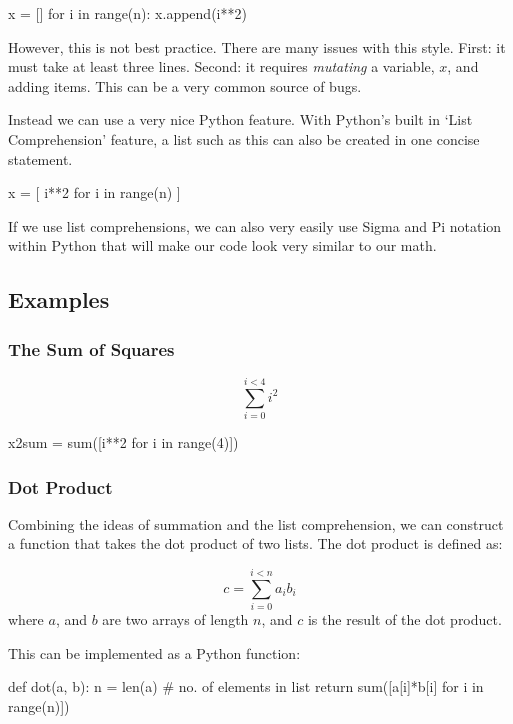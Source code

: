 \documentclass{../../KDHnotes}
\begin{document}
\begin{python}
x = []
for i in range(n):
    x.append(i**2)
\end{python}

However, this is not best practice. There are many issues with this style. First: it must take at least three lines. Second: it requires \textit{mutating} a variable, $x$, and adding items. This can be a very common source of bugs.

Instead we can use a very nice Python feature. With Python's built in `List Comprehension' feature, a list such as this can also be created in one concise statement.

\begin{python}
x = [ i**2 for i in range(n) ]
\end{python}


If we use list comprehensions, we can also very easily use Sigma and Pi notation within Python that will make our code look very similar to our math.

\subsection{Examples}

\subsubsection{The Sum of Squares}
\begin{equation}
\sum_{i=0}^{i<4} i^2
\end{equation}

\begin{python}
x2sum = sum([i**2 for i in range(4)])
\end{python}



\subsubsection{Dot Product}

Combining the ideas of summation and the list comprehension, we can construct a function that takes the dot product of two lists. The dot product is defined as:

\begin{equation}
	c = \sum_{i=0}^{i<n} a_i b_i
\end{equation}
where $a$, and $b$ are two arrays of length $n$, and $c$ is the result of the dot product.

This can be implemented as a Python function:
\begin{python}
def dot(a, b):
  n = len(a) # no. of elements in list
  return sum([a[i]*b[i] for i in range(n)])
\end{python}
\end{document}

